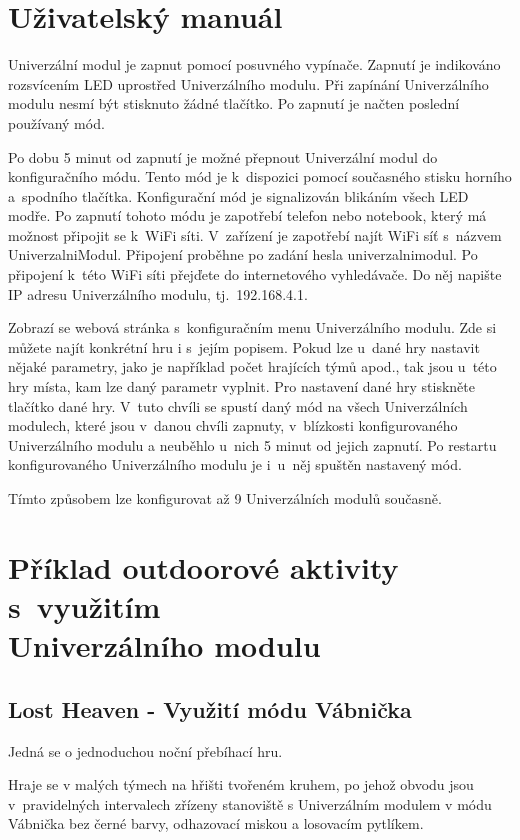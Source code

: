 \chapter{Uživatelský manuál}
Univerzální modul je zapnut pomocí posuvného vypínače. Zapnutí je indikováno rozsvícením LED uprostřed Univerzálního modulu. Při zapínání Univerzálního modulu nesmí být stisknuto žádné tlačítko. Po zapnutí je načten 
poslední používaný mód. 

Po dobu 5 minut od zapnutí je možné přepnout Univerzální modul do konfiguračního módu. Tento mód je k~dispozici pomocí současného stisku horního a~spodního tlačítka. Konfigurační mód je signalizován blikáním všech 
LED modře. Po zapnutí tohoto módu je zapotřebí telefon 
nebo notebook, který má možnost připojit se k~WiFi síti. V~zařízení je zapotřebí najít WiFi síť s~názvem UniverzalniModul. Připojení proběhne po zadání hesla univerzalnimodul. Po připojení k~této WiFi síti přejďete 
do internetového vyhledávače. Do něj napište IP adresu Univerzálního modulu, tj.~192.168.4.1. 

Zobrazí se webová stránka s~konfiguračním menu Univerzálního modulu. Zde si můžete najít konkrétní hru i s~jejím popisem. Pokud lze u~dané hry nastavit nějaké parametry, jako je například počet hrajících týmů apod., tak 
jsou u~této hry místa, kam lze daný parametr vyplnit. Pro nastavení dané hry stiskněte tlačítko dané hry. V~tuto chvíli se spustí daný mód na všech Univerzálních modulech, 
které jsou v~danou chvíli zapnuty, v~blízkosti konfigurovaného Univerzálního modulu a neuběhlo u~nich 5 minut od jejich zapnutí. Po restartu konfigurovaného Univerzálního modulu je i~u~něj spuštěn nastavený mód. 

Tímto způsobem lze konfigurovat až 9 Univerzálních modulů současně. 

\chapter{Příklad outdoorové aktivity s~využitím \\Univerzálního modulu}
\section{Lost Heaven - Využití módu Vábnička}
Jedná se o jednoduchou noční přebíhací hru.

Hraje se v malých týmech na hřišti tvořeném kruhem, po jehož obvodu jsou v~pravidelných intervalech zřízeny stanoviště s Univerzálním modulem v módu Vábnička bez černé barvy, odhazovací miskou a losovacím pytlíkem. 


